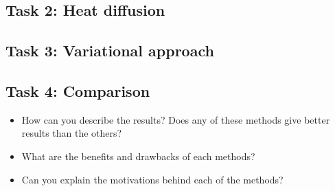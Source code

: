 \documentclass[paper=a4, fontsize=11pt]{scrartcl} %
\numberwithin{equation}{section} %
\numberwithin{figure}{section} %
\numberwithin{table}{section} %
\begin{document}

\subsection{Task 2: Heat diffusion}


\subsection{Task 3: Variational approach}



\subsection{Task 4: Comparison}

\begin{itemize}
	\item How can you describe the results? Does any of these methods give better results than the others? 
	\item What are the benefits and drawbacks of each methods?
	\item Can you explain the motivations behind each of the methods? 
\end{itemize}



 

\end{document}
